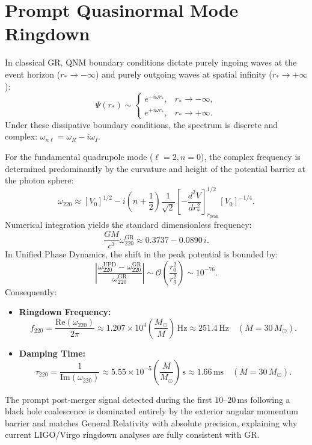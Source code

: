 \documentclass[11pt,a4paper]{article}
\begin{document}
\section{Prompt Quasinormal Mode Ringdown}

In classical GR, QNM boundary conditions dictate purely ingoing waves at the event horizon ($r_* \to -\infty$) and purely outgoing waves at spatial infinity ($r_* \to +\infty$):
\begin{equation}
\Psi(r_*) \sim 
\begin{cases}
e^{-i \omega r_*}, & r_* \to -\infty, \\
e^{+i \omega r_*}, & r_* \to +\infty.
\end{cases}
\end{equation}
Under these dissipative boundary conditions, the spectrum is discrete and complex: $\omega_{n\ell} = \omega_R - i \omega_I$.

For the fundamental quadrupole mode ($\ell = 2, n = 0$), the complex frequency is determined predominantly by the curvature and height of the potential barrier at the photon sphere:
\begin{equation}
\omega_{220} \approx \left[ V_0 \right]^{1/2} - i \left( n + \frac{1}{2} \right) \frac{1}{\sqrt{2}} \left[ -\frac{d^2 V}{dr_*^2} \right]_{r_{\mathrm{peak}}}^{1/2} \left[ V_0 \right]^{-1/4}.
\end{equation}
Numerical integration yields the standard dimensionless frequency:
\begin{equation}
\frac{G M}{c^3} \omega_{220}^{\mathrm{GR}} \approx 0.3737 - 0.0890\, i.
\end{equation}
In Unified Phase Dynamics, the shift in the peak potential is bounded by:
\begin{equation}
\left| \frac{\omega_{220}^{\mathrm{UPD}} - \omega_{220}^{\mathrm{GR}}}{\omega_{220}^{\mathrm{GR}}} \right| \sim \mathcal{O}\left( \frac{r_0^2}{r_g^2} \right) \sim 10^{-76}.
\end{equation}
Consequently:
\begin{itemize}
    \item \textbf{Ringdown Frequency:}
    \begin{equation}
    f_{220} = \frac{\mathrm{Re}(\omega_{220})}{2\pi} \approx 1.207 \times 10^4 \left( \frac{M_\odot}{M} \right)\,\mathrm{Hz} \approx 251.4\,\mathrm{Hz} \quad (M = 30\,M_\odot).
    \end{equation}
    \item \textbf{Damping Time:}
    \begin{equation}
    \tau_{220} = \frac{1}{\mathrm{Im}(\omega_{220})} \approx 5.55 \times 10^{-5} \left( \frac{M}{M_\odot} \right)\,\mathrm{s} \approx 1.66\,\mathrm{ms} \quad (M = 30\,M_\odot).
    \end{equation}
\end{itemize}
The prompt post-merger signal detected during the first $10\text{--}20\,\mathrm{ms}$ following a black hole coalescence is dominated entirely by the exterior angular momentum barrier and matches General Relativity with absolute precision, explaining why current LIGO/Virgo ringdown analyses are fully consistent with GR.
\end{document}
